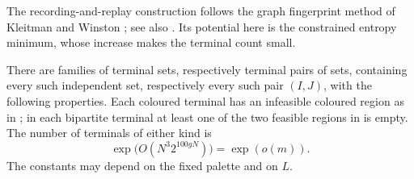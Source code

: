 The recording-and-replay construction follows the graph fingerprint
method of Kleitman and Winston \citep{kleitmanwinston1982}; see also
\citet{samotij2015}. Its potential here is the constrained entropy
minimum, whose increase makes the terminal count small.

\begin{lemma}\label{gt:fingerprints}
There are families of terminal sets, respectively terminal pairs
of sets, containing every such independent set, respectively every
such pair \((I,J)\), with the following properties.  Each coloured
terminal has an infeasible coloured region as in
; in each bipartite terminal at least one of
the two feasible regions in  is empty.
The number of terminals of either kind is
\begin{equation}\label{eq:transfer-terminal-count}
 \exp\bigl(O(N^3 2^{100gN})\bigr)=\exp(o(m)).
\end{equation}
The constants may depend on the fixed palette and on \(L\).
\end{lemma}
